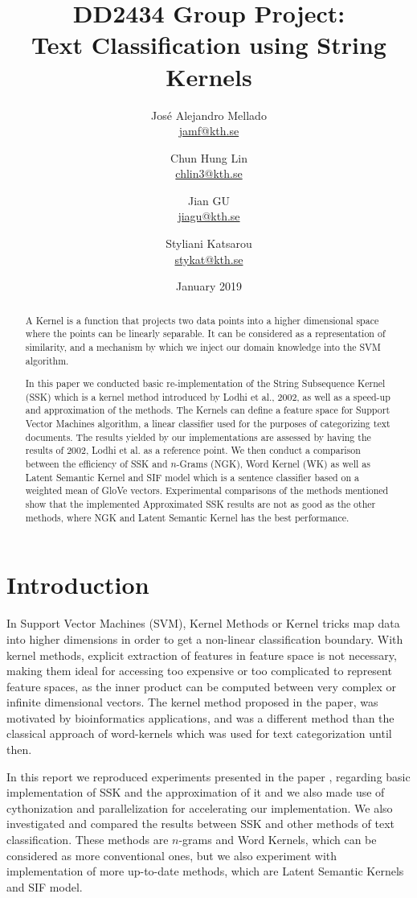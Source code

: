 \documentclass{article}
\title{DD2434 Group Project:\\Text Classification using String Kernels}
\author{
    José Alejandro Mellado \\
    \href{mailto:jamf@kth.se}{jamf@kth.se}
    \and
    Chun Hung Lin \\
    \href{mailto:chlin3@kth.se}{chlin3@kth.se}
    \and
    Jian GU \\
    \href{mailto:jiagu@kth.se}{jiagu@kth.se}
    \and
    Styliani Katsarou \\
    \href{mailto:stykat@kth.se}{stykat@kth.se}
}
\date{January 2019}
\begin{document}
\maketitle

\begin{abstract}

A Kernel is a function that projects two data points into a higher dimensional space where the points can be linearly separable. It can be considered as a representation of similarity, and a mechanism by which we inject our domain knowledge into the SVM algorithm.

In this paper we conducted basic re-implementation of the String Subsequence Kernel (SSK) which is a kernel method introduced by Lodhi et al., 2002\cite{1}, as well as a speed-up and approximation of the methods. The Kernels can define a feature space for Support Vector Machines algorithm, a linear classifier used for the purposes of categorizing text documents. The results yielded by our implementations are assessed by having the results of 2002, Lodhi et al. as a reference point. We then conduct a comparison between the efficiency of SSK and $n$-Grams (NGK), Word Kernel (WK) as well as Latent Semantic Kernel and SIF model which is a sentence classifier based on a weighted mean of GloVe vectors. Experimental comparisons of the methods mentioned show that the implemented Approximated SSK results are not as good as the other methods, where NGK and Latent Semantic Kernel has the best performance.

\end{abstract}
\newpage

\FloatBarrier
\section{Introduction}

In Support Vector Machines (SVM), Kernel Methods or Kernel tricks map data into higher dimensions in order to get a non-linear classification boundary. With kernel methods, explicit extraction of features in feature space is not necessary, making them ideal for accessing too expensive or too complicated to represent feature spaces, as the inner product can be computed between very complex or infinite dimensional vectors. The kernel method proposed in the paper, was motivated by bioinformatics applications, and was a different method than the classical approach of word-kernels which was used for text categorization until then.

In this report we reproduced experiments presented in the paper \cite{1}, regarding basic implementation of SSK and the approximation of it and we also made use of cythonization and parallelization for accelerating our implementation. We also investigated and compared the results between SSK and other methods of text classification. These methods are $n$-grams and Word Kernels, which can be considered as more conventional ones, but we also experiment with implementation of more up-to-date methods, which are Latent Semantic Kernels and SIF model.
\end{document}
